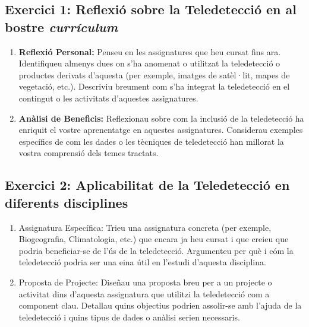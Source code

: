 \documentclass[
]{book}
\providecommand{\tightlist}{%
  \setlength{\itemsep}{0pt}\setlength{\parskip}{0pt}}
\begin{document}
\hypertarget{exercici-1-reflexiuxf3-sobre-la-teledetecciuxf3-en-al-bostre-curruxedculum}{%
\subsection*{\texorpdfstring{Exercici 1: Reflexió sobre la Teledetecció en al bostre \emph{currículum}}{Exercici 1: Reflexió sobre la Teledetecció en al bostre currículum}}\label{exercici-1-reflexiuxf3-sobre-la-teledetecciuxf3-en-al-bostre-curruxedculum}}

\begin{enumerate}
\def\labelenumi{\arabic{enumi}.}
\tightlist
\item
  \textbf{Reflexió Personal:} Penseu en les assignatures que heu cursat fins ara. Identifiqueu almenys dues on s'ha anomenat o utilitzat la teledetecció o productes derivats d'aquesta (per exemple, imatges de satèl·lit, mapes de vegetació, etc.). Descriviu breument com s'ha integrat la teledetecció en el contingut o les activitats d'aquestes assignatures.
\item
  \textbf{Anàlisi de Beneficis:} Reflexionau sobre com la inclusió de la teledetecció ha enriquit el vostre aprenentatge en aquestes assignatures. Considerau exemples específics de com les dades o les tècniques de teledetecció han millorat la vostra comprensió dels temes tractats.
\end{enumerate}

\hypertarget{exercici-2-aplicabilitat-de-la-teledetecciuxf3-en-diferents-disciplines}{%
\subsection*{Exercici 2: Aplicabilitat de la Teledetecció en diferents disciplines}\label{exercici-2-aplicabilitat-de-la-teledetecciuxf3-en-diferents-disciplines}}

\begin{enumerate}
\def\labelenumi{\arabic{enumi}.}
\tightlist
\item
  Assignatura Específica: Trieu una assignatura concreta (per exemple, Biogeografia, Climatologia, etc.) que encara ja heu cursat i que creieu que podria beneficiar-se de l'ús de la teledetecció. Argumenteu per què i cóm la teledetecció podria ser una eina útil en l'estudi d'aquesta disciplina.
\item
  Proposta de Projecte: Diseñau una proposta breu per a un projecte o activitat dins d'aquesta assignatura que utilitzi la teledetecció com a component clau. Detallau quins objectius podrien assolir-se amb l'ajuda de la teledetecció i quins tipus de dades o anàlisi serien necessaris.
\end{enumerate}
\end{document}
